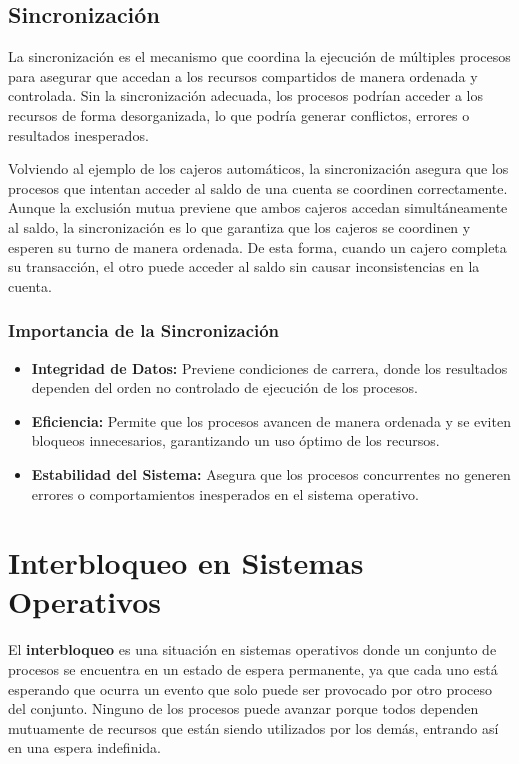 \subsection{Sincronización}

La sincronización es el mecanismo que coordina la ejecución de múltiples procesos para asegurar que accedan a los recursos compartidos de manera ordenada y controlada. Sin la sincronización adecuada, los procesos podrían acceder a los recursos de forma desorganizada, lo que podría generar conflictos, errores o resultados inesperados.

Volviendo al ejemplo de los cajeros automáticos, la sincronización asegura que los procesos que intentan acceder al saldo de una cuenta se coordinen correctamente. Aunque la exclusión mutua previene que ambos cajeros accedan simultáneamente al saldo, la sincronización es lo que garantiza que los cajeros se coordinen y esperen su turno de manera ordenada. De esta forma, cuando un cajero completa su transacción, el otro puede acceder al saldo sin causar inconsistencias en la cuenta.

\subsubsection{Importancia de la Sincronización} \begin{itemize} \item \textbf{Integridad de Datos:} Previene condiciones de carrera, donde los resultados dependen del orden no controlado de ejecución de los procesos. \item \textbf{Eficiencia:} Permite que los procesos avancen de manera ordenada y se eviten bloqueos innecesarios, garantizando un uso óptimo de los recursos. \item \textbf{Estabilidad del Sistema:} Asegura que los procesos concurrentes no generen errores o comportamientos inesperados en el sistema operativo. \end{itemize}

\newpage

\section{Interbloqueo en Sistemas Operativos}

El \textbf{interbloqueo} es una situación en sistemas operativos donde un conjunto de procesos se encuentra en un estado de espera permanente, ya que cada uno está esperando que ocurra un evento que solo puede ser provocado por otro proceso del conjunto. Ninguno de los procesos puede avanzar porque todos dependen mutuamente de recursos que están siendo utilizados por los demás, entrando así en una espera indefinida.

